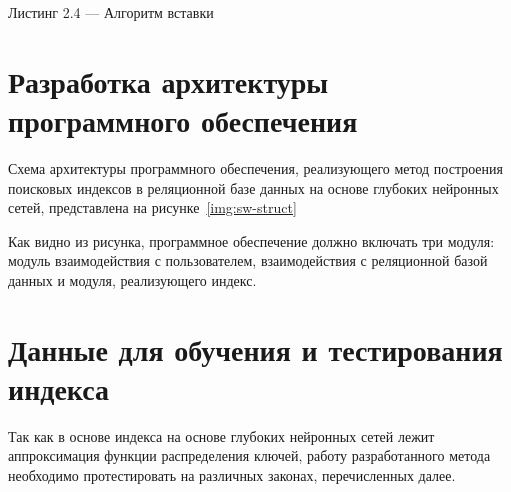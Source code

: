 \noindent\parbox[t]{\linewidth}{
Листинг 2.4 --- Алгоритм вставки
}
\begin{algorithm}[H]
    \label{alg:insert}
    \small


\end{algorithm}

\section{Разработка архитектуры программного обеспечения}

Схема архитектуры программного обеспечения, реализующего метод построения
поисковых индексов в реляционной базе данных на основе глубоких нейронных сетей,
представлена на рисунке~\ref{img:sw-struct}


Как видно из рисунка, программное обеспечение должно включать три модуля:
модуль взаимодействия с пользователем, взаимодействия с реляционной базой данных и
модуля, реализующего индекс.


\section{Данные для обучения и тестирования индекса\label{data}}

Так как в основе индекса на основе глубоких нейронных сетей лежит аппроксимация
функции распределения ключей, работу разработанного метода необходимо
протестировать на различных законах, перечисленных далее.

